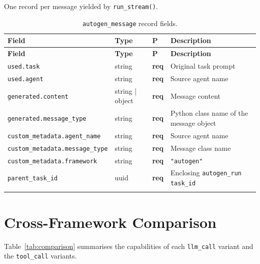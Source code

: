 \documentclass[11pt,a4paper]{article}
\newcommand{\req}{\textbf{req}}
\newcommand{\subtype}[1]{\texttt{\textcolor{subtypeblue}{#1}}}
\begin{document}
One record per message yielded by \texttt{run\_stream()}.

\begin{longtable}{L{4cm} L{2.5cm} C{1.2cm} L{6.5cm}}
\toprule
\textbf{Field} & \textbf{Type} & \textbf{P} & \textbf{Description} \\
\midrule
\endfirsthead
\toprule \textbf{Field} & \textbf{Type} & \textbf{P} & \textbf{Description} \\
\midrule
\endhead
\bottomrule
\endlastfoot

\texttt{used.task}    & string & \req & Original task prompt \\
\texttt{used.agent}   & string & \req & Source agent name \\
\texttt{generated.content}
  & string | object & \req & Message content \\
\texttt{generated.message\_type}
  & string & \req & Python class name of the message object \\
\texttt{custom\_metadata.agent\_name}   & string & \req & Source agent name \\
\texttt{custom\_metadata.message\_type} & string & \req & Message class name \\
\texttt{custom\_metadata.framework}     & string & \req & \texttt{"autogen"} \\
\texttt{parent\_task\_id}
  & uuid & \req & Enclosing \subtype{autogen\_run} \texttt{task\_id} \\

\caption{\subtype{autogen\_message} record fields.}
\end{longtable}

\section{Cross-Framework Comparison}

Table~\ref{tab:comparison} summarises the capabilities of each \subtype{llm\_call}
variant and the \subtype{tool\_call} variants.
\end{document}
